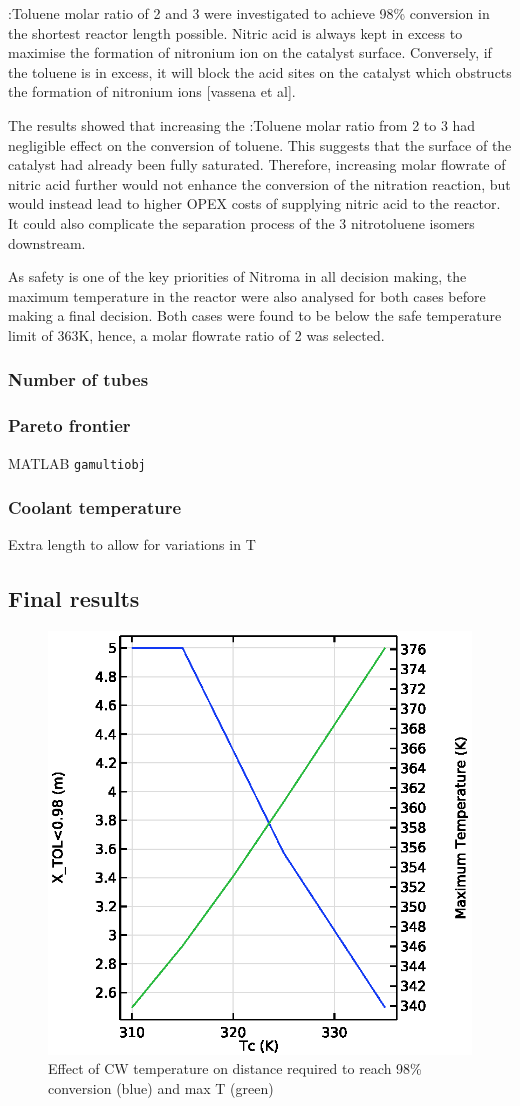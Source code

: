 :Toluene molar ratio of 2 and 3 were investigated to achieve 98\% conversion in the shortest reactor length possible. Nitric acid is always kept in excess to maximise the formation of nitronium ion on the catalyst surface. Conversely, if the toluene is in excess, it will block the acid sites on the catalyst which obstructs the formation of nitronium ions [vassena et al]. 

The results showed that increasing the :Toluene molar ratio from 2 to 3 had negligible effect on the conversion of toluene. This suggests that the surface of the catalyst had already been fully saturated. Therefore, increasing molar flowrate of nitric acid further would not enhance the conversion of the nitration reaction, but would instead lead to higher OPEX costs of supplying nitric acid to the reactor. It could also complicate the separation process of the 3 nitrotoluene isomers downstream. 

As safety is one of the key priorities of Nitroma in all decision making, the maximum temperature in the reactor were also analysed for both cases before making a final decision. Both cases were found to be below the safe temperature limit of 363K, hence, a molar flowrate ratio of 2 was selected.

\subsubsection{Number of tubes}

\subsubsection{Pareto frontier}
MATLAB \texttt{gamultiobj}

\subsubsection{Coolant temperature}
Extra length to allow for variations in T

\subsection{Final results}
\begin{figure}[h]
    \centering
    \includegraphics[width=0.49\linewidth]{figures/S4-CW-X-T.eps}
    \caption{Effect of CW temperature on distance required to reach 98\% conversion (blue) and max T (green)}
    \label{fig:comsol-S4-CW-X-T}
\end{figure}

